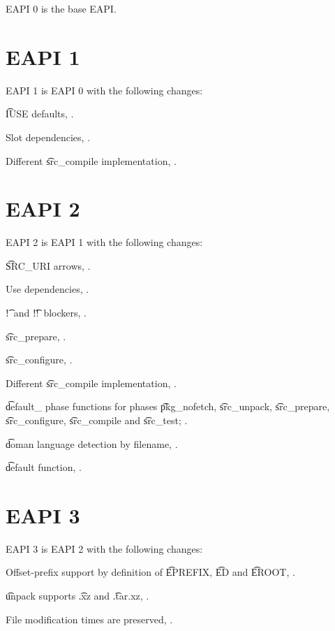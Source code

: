 EAPI 0 is the base EAPI.

\section*{EAPI 1}

EAPI 1 is EAPI 0 with the following changes:

\begin{compactitem}
\item \t{IUSE} defaults, .
\item Slot dependencies, .
\item Different \t{src_compile} implementation, .
\end{compactitem}

\section*{EAPI 2}

EAPI 2 is EAPI 1 with the following changes:

\begin{compactitem}
\item \t{SRC_URI} arrows, .
\item Use dependencies, .
\item \t{!}\ and \t{!!}\ blockers, .
\item \t{src_prepare}, .
\item \t{src_configure}, .
\item Different \t{src_compile} implementation, .
\item \t{default_} phase functions for phases \t{pkg_nofetch}, \t{src_unpack}, \t{src_prepare},
    \t{src_configure}, \t{src_compile} and \t{src_test}; .
\item \t{doman} language detection by filename, .
\item \t{default} function, .
\end{compactitem}

\section*{EAPI 3}

EAPI 3 is EAPI 2 with the following changes:
\begin{compactitem}
\item Offset-prefix support by definition of \t{EPREFIX}, \t{ED} and \t{EROOT},
    .
\item \t{unpack} supports \t{.xz} and \t{.tar.xz}, .
\item File modification times are preserved, .
\end{compactitem}

